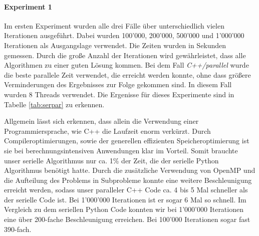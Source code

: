\documentclass[sigconf]{acmart}
\begin{document}
\paragraph{Experiment 1}

Im ersten Experiment wurden alle drei Fälle über unterschiedlich vielen Iterationen ausgeführt. Dabei wurden 100'000, 200'000, 500'000 und 1'000'000 Iterationen als Ausgangslage verwendet. Die Zeiten wurden in Sekunden gemessen. Durch die große Anzahl der Iterationen wird gewährleistet, dass alle Algorithmen zu einer guten Lösung kommen. 
Bei dem Fall \textit{C++/parallel} wurde die beste parallele Zeit verwendet, die erreicht werden konnte, ohne dass größere Verminderungen des Ergebnisses zur Folge gekommen sind. In diesem Fall wurden 8 Threads verwendet.
 Die Ergenisse für dieses Experimente sind in Tabelle \ref{tab:serpar} zu erkennen.
 
\begin{table}[htbp]
  \caption{Vergleich der Algorithmen und Ausführungsart über 100'000, 200'000, 500'000 und 1'000'000 Iterationen. Alle Angaben in Sekunden.}
  \label{tab:serpar}
\end{table}

Allgemein lässt sich erkennen, dass allein die Verwendung einer Programmiersprache, wie C++ die Laufzeit enorm verkürzt. Durch Compileroptimierungen, sowie der generellen effizienten Speicheroptimierung ist sie bei berechnungsintensiven Anwendungen klar im Vorteil. Somit brauchte unser serielle Algorithmus nur ca. 1\% der Zeit, die der serielle Python Algorithmus benötigt hatte. 
Durch die zusätzliche Verwendung von OpenMP und die Aufteilung des Problems in Subprobleme konnte eine weitere Beschleunigung erreicht werden, sodass unser paralleler C++ Code ca. 4 bis 5 Mal schneller als der serielle Code ist. Bei 1'000'000 Iterationen ist er sogar 6 Mal so schnell. Im Vergleich zu dem seriellen Python Code konnten wir bei 1'000'000 Iterationen eine über 200-fache Beschleunigung erreichen. Bei 100'000 Iterationen sogar fast 390-fach.
\end{document}
